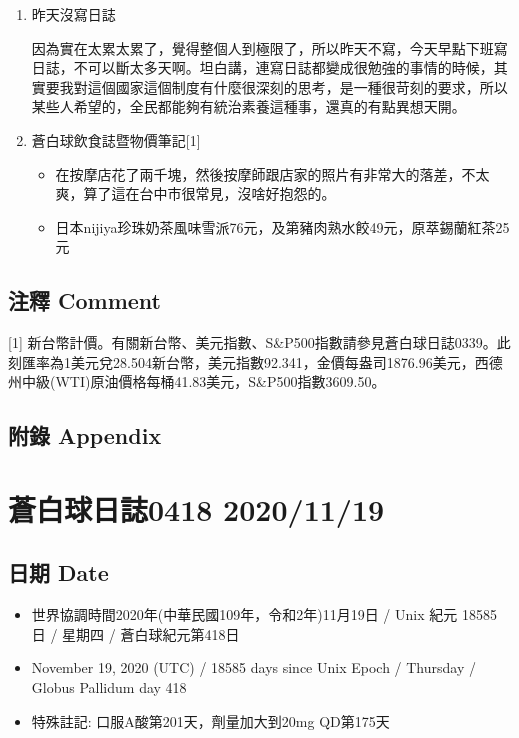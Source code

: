 \documentclass[
]{article}
\providecommand{\tightlist}{%
  \setlength{\itemsep}{0pt}\setlength{\parskip}{0pt}}
\begin{document}
\begin{enumerate}
\def\labelenumi{\arabic{enumi}.}
\item
  昨天沒寫日誌

  因為實在太累太累了，覺得整個人到極限了，所以昨天不寫，今天早點下班寫日誌，不可以斷太多天啊。坦白講，連寫日誌都變成很勉強的事情的時候，其實要我對這個國家這個制度有什麼很深刻的思考，是一種很苛刻的要求，所以某些人希望的，全民都能夠有統治素養這種事，還真的有點異想天開。
\item
  蒼白球飲食誌暨物價筆記{[}1{]}

  \begin{itemize}
  \tightlist
  \item
    在按摩店花了兩千塊，然後按摩師跟店家的照片有非常大的落差，不太爽，算了這在台中市很常見，沒啥好抱怨的。
  \item
    日本nijiya珍珠奶茶風味雪派76元，及第豬肉熟水餃49元，原萃錫蘭紅茶25元
  \end{itemize}
\end{enumerate}

\hypertarget{ux6ce8ux91cb-comment-13}{%
\subsection{注釋 Comment}\label{ux6ce8ux91cb-comment-13}}

{[}1{]}
新台幣計價。有關新台幣、美元指數、S\&P500指數請參見蒼白球日誌0339。此刻匯率為1美元兌28.504新台幣，美元指數92.341，金價每盎司1876.96美元，西德州中級(WTI)原油價格每桶41.83美元，S\&P500指數3609.50。

\hypertarget{ux9644ux9304-appendix-13}{%
\subsection{附錄 Appendix}\label{ux9644ux9304-appendix-13}}

\hypertarget{ux84bcux767dux7403ux65e5ux8a8c0418-20201119}{%
\section{蒼白球日誌0418
2020/11/19}\label{ux84bcux767dux7403ux65e5ux8a8c0418-20201119}}

\hypertarget{ux65e5ux671f-date-14}{%
\subsection{日期 Date}\label{ux65e5ux671f-date-14}}

\begin{itemize}
\tightlist
\item
  世界協調時間2020年(中華民國109年，令和2年)11月19日 / Unix 紀元 18585
  日 / 星期四 / 蒼白球紀元第418日
\item
  November 19, 2020 (UTC) / 18585 days since Unix Epoch / Thursday /
  Globus Pallidum day 418
\item
  特殊註記: 口服A酸第201天，劑量加大到20mg QD第175天
\end{itemize}
\end{document}
